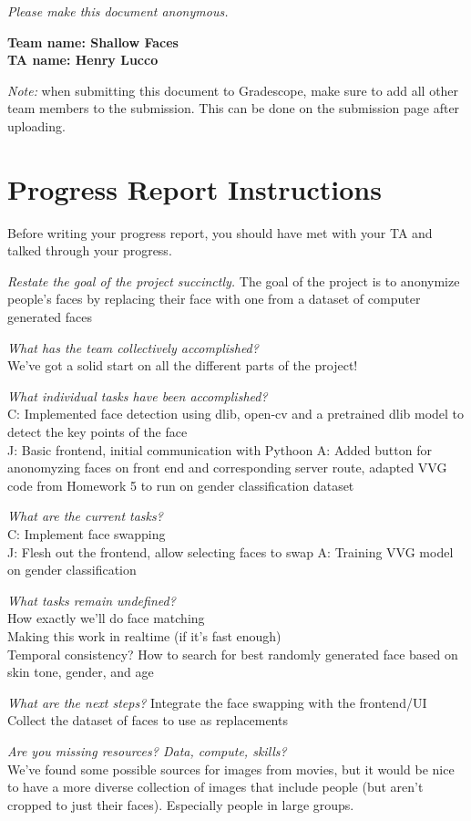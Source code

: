 \emph{Please make this document anonymous.}

\textbf{Team name: Shallow Faces}\\
\textbf{TA name: Henry Lucco}

\emph{Note:} when submitting this document to Gradescope, make sure to add all other team members to the submission. This can be done on the submission page after uploading.

\section*{Progress Report Instructions}

Before writing your progress report, you should have met with your TA and talked through your progress.

%
\textit{Restate the goal of the project succinctly.}
The goal of the project is to anonymize people's faces by replacing their face with one from a dataset of computer generated faces

\textit{What has the team collectively accomplished?}\\
We've got a solid start on all the different parts of the project!

\textit{What individual tasks have been accomplished?}\\
C: Implemented face detection using dlib, open-cv and a pretrained dlib model to detect the key points of the face\\
J: Basic frontend, initial communication with Pythoon
A: Added button for anonomyzing faces on front end and corresponding server route, adapted VVG code from Homework 5 to run on gender classification dataset

\textit{What are the current tasks?}\\
C: Implement face swapping\\
J: Flesh out the frontend, allow selecting faces to swap
A: Training VVG model on gender classification

\textit{What tasks remain undefined?}\\
How exactly we'll do face matching\\
Making this work in realtime (if it's fast enough)\\
Temporal consistency?
How to search for best randomly generated face based on skin tone, gender, and age

\textit{What are the next steps?}
Integrate the face swapping with the frontend/UI\\
Collect the dataset of faces to use as replacements

%
\textit{Are you missing resources? Data, compute, skills?}\\
We've found some possible sources for images from movies, but it would be nice to have a more diverse collection of images that include people (but aren't cropped to just their faces). Especially people in large groups.


